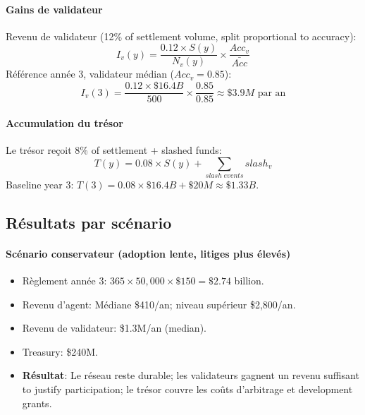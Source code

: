 \documentclass[11pt]{article}
\begin{document}
\paragraph{Gains de validateur} Revenu de validateur (12\% of settlement volume, split proportional to accuracy):
\begin{equation}
I_v(y) = \frac{0.12 \times S(y)}{N_v(y)} \times \frac{Acc_v}{\bar{Acc}}
\end{equation}
Référence année 3, validateur médian ($Acc_v = 0.85$):
\begin{equation}
I_v(3) = \frac{0.12 \times \$16.4B}{500} \times \frac{0.85}{0.85} \approx \$3.9M \text{ par an}
\end{equation}

\paragraph{Accumulation du trésor} Le trésor reçoit 8\% of settlement + slashed funds:
\begin{equation}
T(y) = 0.08 \times S(y) + \sum_{slash \; events} slash_v
\end{equation}
Baseline year 3: $T(3) = 0.08 \times \$16.4B + \$20M \approx \$1.33B$.

\subsection{Résultats par scénario}
\paragraph{Scénario conservateur (adoption lente, litiges plus élevés)}
\begin{itemize}[noitemsep]
  \item Règlement année 3: $365 \times 50{,}000 \times \$150 = \$2.74$ billion.
  \item Revenu d'agent: Médiane \$410/an; niveau supérieur \$2{,}800/an.
  \item Revenu de validateur: \$1.3M/an (median).
  \item Treasury: \$240M.
  \item \textbf{Résultat}: Le réseau reste durable; les validateurs gagnent un revenu suffisant to justify participation; le trésor couvre les coûts d'arbitrage et development grants.
\end{itemize}
\end{document}

